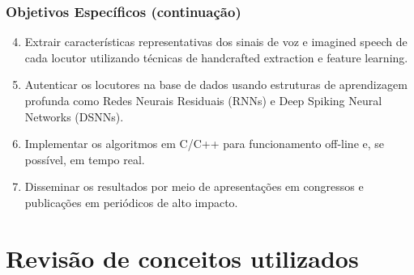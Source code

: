 \documentclass[aspectratio=169]{beamer}
\begin{document}
	\begin{frame}
		\frametitle{Objetivos Específicos (continuação)}
		\begin{enumerate}
			\setcounter{enumi}{3}
			\item Extrair características representativas dos sinais de voz e imagined speech de cada locutor utilizando técnicas de handcrafted extraction e feature learning.
			\item Autenticar os locutores na base de dados usando estruturas de aprendizagem profunda como Redes Neurais Residuais (RNNs) e Deep Spiking Neural Networks (DSNNs).
			\item Implementar os algoritmos em C/C++ para funcionamento off-line e, se possível, em tempo real.
			\item Disseminar os resultados por meio de apresentações em congressos e publicações em periódicos de alto impacto.
		\end{enumerate}
	\end{frame}
		


	\section{Revisão de conceitos utilizados}
\end{document}
